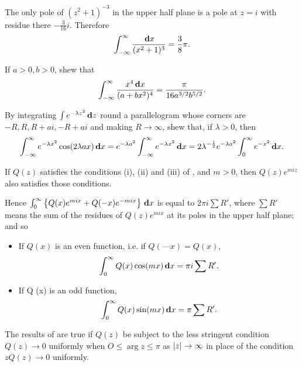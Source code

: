 \begin{wandwexample}
  The only pole of $(z^{2} + 1)^{-3}$ in the upper half plane is a
  pole at $z=i$ with residue there $-\frac{3}{16} i$. Therefore
  $$
  \int_{-\infty}^{\infty} \frac{\, \mathbf{d} x}{ (x^{2}+1)^{3} }
  =
  \frac{3}{8} \pi.
  $$
\end{wandwexample}
\begin{wandwexample}
If $a > 0, b > 0$, shew that
$$
\int_{-\infty}^{\infty}
\frac{x^{4} \, \mathbf{d} x}{ (a + bx^{2})^{4} }
=
\frac{\pi}{ 16 a^{3/2} b^{5/2}}.
$$
\end{wandwexample}
\begin{wandwexample}
  By integrating $\int e^{-\lambda z^{2}} \, \mathbf{d} z$ round a
parallelogram whose corners are $-R, R, R + ai, -R + ai$ and making $R
\rightarrow \infty$, shew that, if $\lambda > 0$, then
  $$
  \int_{-\infty}^{\infty} e^{-\lambda x^{2}} \cos (2\lambda a x)
\, \mathbf{d} x = e^{-\lambda a^{2}} \int_{-\infty}^{\infty} e^{-\lambda
x^{2}} \, \mathbf{d} x = 2 \lambda^{-\frac{1}{2}} e^{-\lambda a^{2}}
\int_{0}^{\infty} e^{-x^{2}} \, \mathbf{d} x.
  $$
\end{wandwexample}
If $Q(z)$ satisfies the conditions (i), (ii) and (iii) of
, and $m > 0$,
then $Q(z) e^{miz}$ also satisfies those conditions.

%
%

Hence
$
\int_{0}^{\infty}
\left\{ 
  Q(x) e^{mix} + Q(-x) e^{-mix}
 \right\}
\, \mathbf{d} x
$
is equal to $2\pi i \sum R'$, where
$\sum R'$ means the sum of the residues of $Q(z) e^{mix}$ at its poles
in the upper half plane; and so
\begin{itemize}
\item %
  If $Q(x)$ is an even function, i.e. if $Q (— x) = Q (x)$,
  $$
  \int_{0}^{\infty} Q(x) \cos(mx) \, \mathbf{d} x
  =
  \pi i \sum R'.
  $$
\item %
  If Q (x) is an odd function,
  $$
  \int_{0}^{\infty} Q(x) \sin(mx) \, \mathbf{d} x
  =
  \pi \sum R'.
  $$
\end{itemize}

The results of  are true if $Q(z)$ be
subject to the less stringent condition $Q(z) \rightarrow 0$ uniformly
when
$O \leq \arg z \leq \pi$ as $\left| z \right| \rightarrow \infty$ in
place of the condition $z Q(z) \rightarrow 0$ uniformly.

